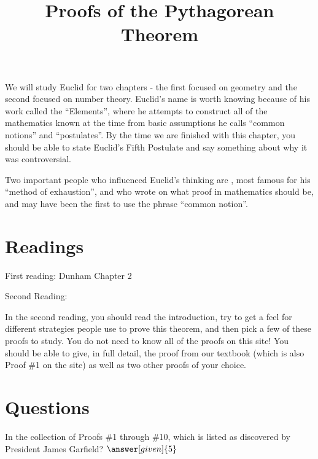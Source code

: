 \documentclass[nooutcomes]{ximera}
\title{Proofs of the Pythagorean Theorem}
\begin{document}
\begin{abstract}
    
\end{abstract}
\maketitle


We will study Euclid for two chapters - the first focused on geometry and the second focused on number theory.  Euclid's name is worth knowing because of his work called the ``Elements'', where he attempts to construct all of the mathematics known at the time from basic assumptions he calls ``common notions'' and ``postulates''.  By the time we are finished with this chapter, you should be able to state Euclid's Fifth Postulate and say something about why it was controversial.  

Two important people who influenced Euclid's thinking are , most famous for his ``method of exhaustion'', and  who wrote on what proof in mathematics should be, and may have been the first to use the phrase ``common notion''.


\section{Readings}
First reading: Dunham Chapter 2

Second Reading: 
  

In the second reading, you should read the introduction, try to get a feel for different strategies people use to prove this theorem, and then pick a few of these proofs to study.  You do not need to know all of the proofs on this site!  You should be able to give, in full detail, the proof from our textbook (which is also Proof \#1 on the site) as well as two other proofs of your choice.


\section{Questions}

\begin{question}
In the collection of Proofs \#1 through \#10, which is listed as discovered by President James Garfield?
$\answer[given]{5}$
\end{question}
\end{document}
